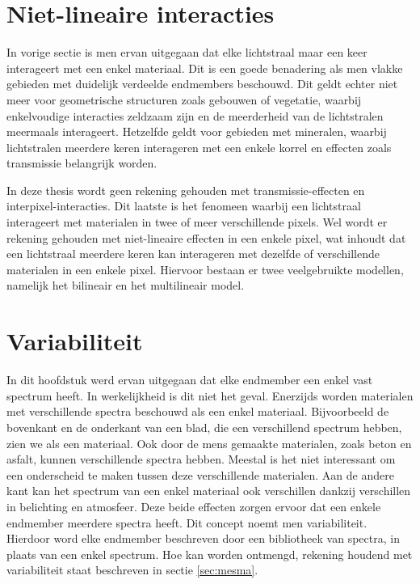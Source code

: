 \documentclass[12pt]{report}
\begin{document}
\section{Niet-lineaire interacties}

In vorige sectie is men ervan uitgegaan dat elke lichtstraal maar een keer interageert met een enkel materiaal. Dit is een goede benadering als men vlakke gebieden met duidelijk verdeelde endmembers beschouwd. Dit geldt echter niet meer voor geometrische structuren zoals gebouwen of vegetatie, waarbij enkelvoudige interacties zeldzaam zijn en de meerderheid van de lichtstralen meermaals interageert. Hetzelfde geldt voor gebieden met mineralen, waarbij lichtstralen meerdere keren interageren met een enkele korrel en effecten zoals transmissie belangrijk worden.

In deze thesis wordt geen rekening gehouden met transmissie-effecten en interpixel-interacties. Dit laatste is het fenomeen waarbij een lichtstraal interageert met materialen in twee of meer verschillende pixels. Wel wordt er rekening gehouden met niet-lineaire effecten in een enkele pixel, wat inhoudt dat een lichtstraal meerdere keren kan interageren met dezelfde of verschillende materialen in een enkele pixel. Hiervoor bestaan er twee veelgebruikte modellen, namelijk het bilineair en het multilineair model.

\section{Variabiliteit}\label{sec:select}

In dit hoofdstuk werd ervan uitgegaan dat elke endmember een enkel vast spectrum heeft. In werkelijkheid is dit niet het geval. Enerzijds worden materialen met verschillende spectra beschouwd als een enkel materiaal. Bijvoorbeeld de bovenkant en de onderkant van een blad, die een verschillend spectrum hebben, zien we als een materiaal. Ook door de mens gemaakte materialen, zoals beton en asfalt, kunnen verschillende spectra hebben. Meestal is het niet interessant om een onderscheid te maken tussen deze verschillende materialen. Aan de andere kant kan het spectrum van een enkel materiaal ook verschillen dankzij verschillen in belichting en atmosfeer. Deze beide effecten zorgen ervoor dat een enkele endmember meerdere spectra heeft. Dit concept noemt men variabiliteit. Hierdoor word elke endmember beschreven door een bibliotheek van spectra, in plaats van een enkel spectrum. Hoe kan worden ontmengd, rekening houdend met variabiliteit staat beschreven in sectie \ref{sec:mesma}. 
\end{document}
